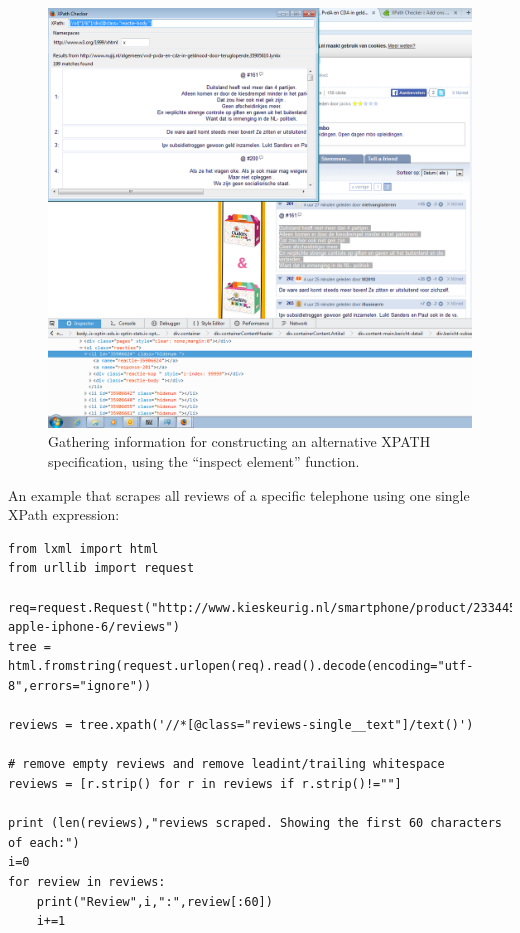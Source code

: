 \documentclass[a4paper,12pt]{book}
\begin{document}
\begin{figure}[h]
	\centering
	\includegraphics[width=\textwidth,keepaspectratio]{../pictures/inspectelementcrop}
	\caption{\label{fig:inspectelement}Gathering information for constructing an alternative XPATH specification, using the ``inspect element'' function.}
\end{figure}


An example that scrapes all reviews of a specific telephone using one single XPath expression:

\begin{lstlisting}
from lxml import html
from urllib import request

req=request.Request("http://www.kieskeurig.nl/smartphone/product/2334455-apple-iphone-6/reviews")
tree = html.fromstring(request.urlopen(req).read().decode(encoding="utf-8",errors="ignore"))        

reviews = tree.xpath('//*[@class="reviews-single__text"]/text()')

# remove empty reviews and remove leadint/trailing whitespace
reviews = [r.strip() for r in reviews if r.strip()!=""]

print (len(reviews),"reviews scraped. Showing the first 60 characters of each:")
i=0
for review in reviews:
    print("Review",i,":",review[:60])
    i+=1
\end{lstlisting}
\end{document}
